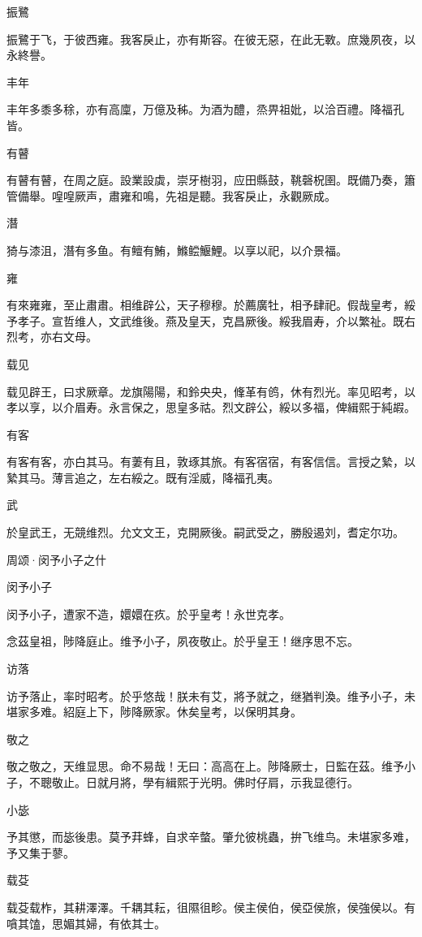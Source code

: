 振鷺

振鷺于飞，于彼西雍。我客戾止，亦有斯容。在彼无惡，在此无斁。庶幾夙夜，以永終譽。

丰年

丰年多黍多稌，亦有高廩，万億及秭。为酒为醴，烝畀祖妣，以洽百禮。降福孔皆。

有瞽

有瞽有瞽，在周之庭。設業設虡，崇牙樹羽，应田縣鼓，鞉磬柷圉。既備乃奏，簫管備舉。喤喤厥声，肅雍和鳴，先祖是聽。我客戾止，永觀厥成。

潛

猗与漆沮，潛有多鱼。有鳣有鮪，鰷鲿鰋鯉。以享以祀，以介景福。

雍

有來雍雍，至止肅肅。相维辟公，天子穆穆。於薦廣牡，相予肆祀。假哉皇考，綏予孝子。宣哲维人，文武维後。燕及皇天，克昌厥後。綏我眉寿，介以繁祉。既右烈考，亦右文母。

载见

载见辟王，曰求厥章。龙旗陽陽，和鈴央央，鞗革有鸧，休有烈光。率见昭考，以孝以享，以介眉寿。永言保之，思皇多祜。烈文辟公，綏以多福，俾緝熙于純嘏。

有客

有客有客，亦白其马。有萋有且，敦琢其旅。有客宿宿，有客信信。言授之縶，以縶其马。薄言追之，左右綏之。既有淫威，降福孔夷。

武

於皇武王，无競维烈。允文文王，克開厥後。嗣武受之，勝殷遏刘，耆定尔功。




周颂·闵予小子之什


闵予小子

闵予小子，遭家不造，嬛嬛在疚。於乎皇考！永世克孝。

念茲皇祖，陟降庭止。维予小子，夙夜敬止。於乎皇王！继序思不忘。

访落

访予落止，率时昭考。於乎悠哉！朕未有艾，將予就之，继猶判渙。维予小子，未堪家多难。紹庭上下，陟降厥家。休矣皇考，以保明其身。

敬之

敬之敬之，天维显思。命不易哉！无曰：高高在上。陟降厥士，日監在茲。维予小子，不聰敬止。日就月將，學有緝熙于光明。佛时仔肩，示我显德行。

小毖

予其懲，而毖後患。莫予荓蜂，自求辛螫。肇允彼桃蟲，拚飞维鸟。未堪家多难，予又集于蓼。

载芟

载芟载柞，其耕澤澤。千耦其耘，徂隰徂畛。侯主侯伯，侯亞侯旅，侯強侯以。有嗿其馌，思媚其婦，有依其士。


